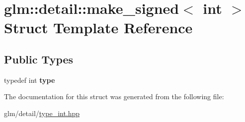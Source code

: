 \hypertarget{structglm_1_1detail_1_1make__signed_3_01int_01_4}{\section{glm\-:\-:detail\-:\-:make\-\_\-signed$<$ int $>$ Struct Template Reference}
\label{structglm_1_1detail_1_1make__signed_3_01int_01_4}
}
\subsection*{Public Types}
\begin{DoxyCompactItemize}
\item 
\hypertarget{structglm_1_1detail_1_1make__signed_3_01int_01_4_a69085e97a5044d1985cdc2116eb6ea9b}{typedef int {\bfseries type}}\label{structglm_1_1detail_1_1make__signed_3_01int_01_4_a69085e97a5044d1985cdc2116eb6ea9b}

\end{DoxyCompactItemize}


The documentation for this struct was generated from the following file\-:\begin{DoxyCompactItemize}
\item 
glm/detail/\hyperlink{type__int_8hpp}{type\-\_\-int.\-hpp}\end{DoxyCompactItemize}
